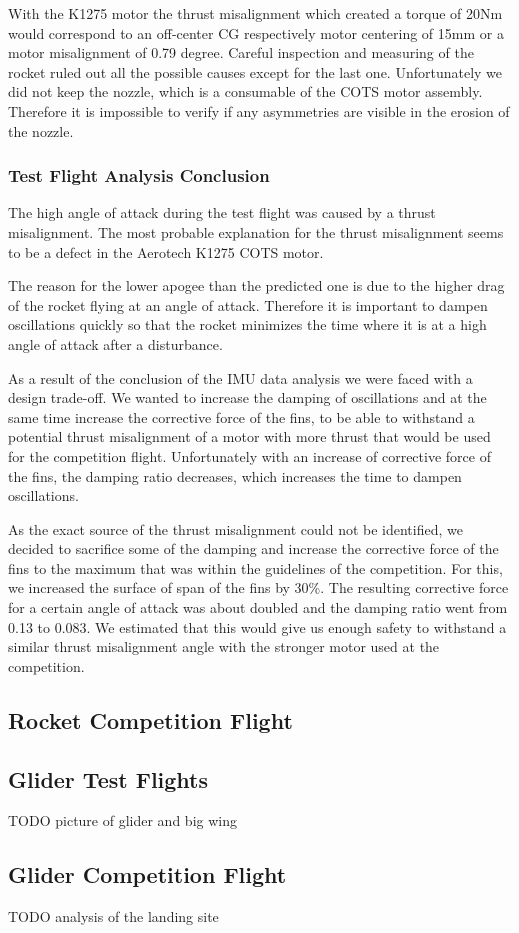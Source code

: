 With the K1275 motor the thrust misalignment which created a torque of 20Nm would correspond to an off-center CG respectively motor centering of 15mm or a motor misalignment of 0.79 degree.
Careful inspection and measuring of the rocket ruled out all the possible causes except for the last one. Unfortunately we did not keep the nozzle, which is a consumable of the COTS motor assembly. Therefore it is impossible to verify if any asymmetries are visible in the erosion of the nozzle.

\subsubsection{Test Flight Analysis Conclusion}

The high angle of attack during the test flight was caused by a thrust misalignment. The most probable explanation for the thrust misalignment seems to be a defect in the Aerotech K1275 COTS motor.

The reason for the lower apogee than the predicted one is due to the higher drag of the rocket flying at an angle of attack. Therefore it is important to dampen oscillations quickly so that the rocket minimizes the time where it is at a high angle of attack after a disturbance.

As a result of the conclusion of the IMU data analysis we were faced with a design trade-off.
We wanted to increase the damping of oscillations and at the same time increase the corrective force of the fins, to be able to withstand a potential thrust misalignment of a motor with more thrust that would be used for the competition flight.
Unfortunately with an increase of corrective force of the fins, the damping ratio decreases, which increases the time to dampen oscillations.

As the exact source of the thrust misalignment could not be identified, we decided to sacrifice some of the damping and increase the corrective force of the fins to the maximum that was within the guidelines of the competition.
For this, we increased the surface of span of the fins by 30\%. The resulting corrective force for a certain angle of attack was about doubled and the damping ratio went from 0.13 to 0.083.
We estimated that this would give us enough safety to withstand a similar thrust misalignment angle with the stronger motor used at the competition.

\subsection{Rocket Competition Flight}


\subsection{Glider Test Flights}

TODO picture of glider and big wing

\subsection{Glider Competition Flight}

TODO analysis of the landing site

